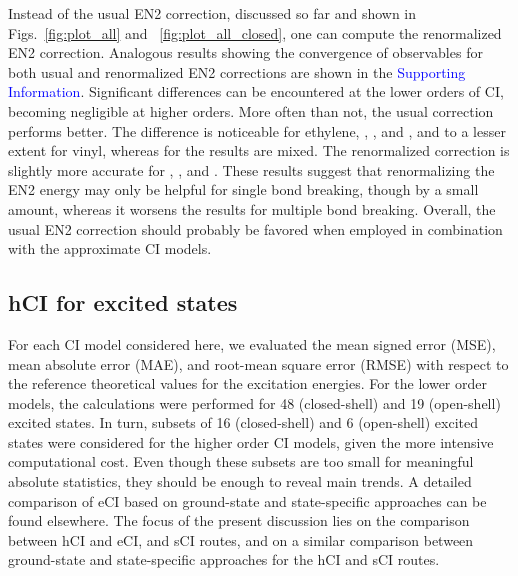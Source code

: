 \documentclass[aip,jcp,reprint,noshowkeys,superscriptaddress]{revtex4-1}
\newcommand{\SupInf}{\textcolor{blue}{Supporting Information}}
\begin{document}
Instead of the usual EN2 correction, discussed so far and shown in Figs.~\ref{fig:plot_all} and ~\ref{fig:plot_all_closed}, 
one can compute the renormalized EN2 correction. \cite{Garniron_2019}
Analogous results showing the convergence of observables for both usual and renormalized EN2 corrections are shown in the {\SupInf}.
Significant differences can be encountered at the lower orders of CI, becoming negligible at higher orders.
More often than not, the usual correction performs better.
The difference is noticeable for ethylene, , , and , and to a lesser extent for vinyl,
whereas for  the results are mixed.
The renormalized correction is slightly more accurate for , , and .
These results suggest that renormalizing the EN2 energy may only be helpful for single bond breaking, though by a small amount,
whereas it worsens the results for multiple bond breaking.
Overall, the usual EN2 correction should probably be favored when employed in combination with the approximate CI models.


\subsection{hCI for excited states}
\label{sec:res_C}

For each CI model considered here, we evaluated the mean signed error (MSE), mean absolute error (MAE), and root-mean square error (RMSE) 
with respect to the reference theoretical values for the excitation energies.
For the lower order models, the calculations were performed for 48 (closed-shell) and 19 (open-shell) excited states.
In turn, subsets of 16 (closed-shell) and 6 (open-shell) excited states were considered for the higher order CI models, given the more intensive computational cost.
Even though these subsets are too small for meaningful absolute statistics, they should be enough to reveal main trends.
A detailed comparison of eCI based on ground-state and state-specific approaches can be found elsewhere. \cite{Kossoski_2023}
The focus of the present discussion lies on the comparison between hCI and eCI, and sCI routes, 
and on a similar comparison between ground-state and state-specific approaches for the hCI and sCI routes.
\end{document}
